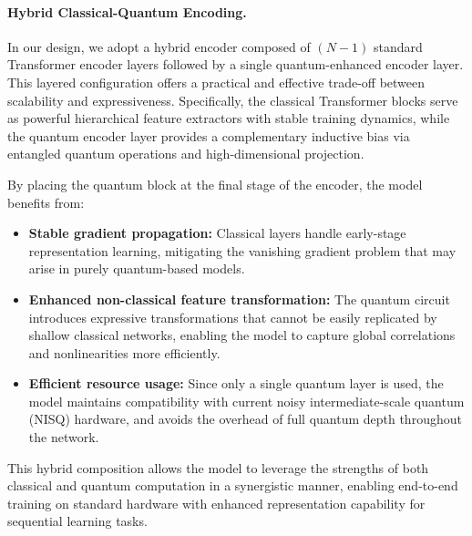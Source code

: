 \documentclass[conference]{IEEEtran}
\begin{document}
\paragraph{Hybrid Classical-Quantum Encoding.}

In our design, we adopt a hybrid encoder composed of $(N{-}1)$ standard Transformer encoder layers followed by a single quantum-enhanced encoder layer. This layered configuration offers a practical and effective trade-off between scalability and expressiveness. Specifically, the classical Transformer blocks serve as powerful hierarchical feature extractors with stable training dynamics, while the quantum encoder layer provides a complementary inductive bias via entangled quantum operations and high-dimensional projection.

By placing the quantum block at the final stage of the encoder, the model benefits from:
\begin{itemize}
    \item \textbf{Stable gradient propagation:} Classical layers handle early-stage representation learning, mitigating the vanishing gradient problem that may arise in purely quantum-based models.
    \item \textbf{Enhanced non-classical feature transformation:} The quantum circuit introduces expressive transformations that cannot be easily replicated by shallow classical networks, enabling the model to capture global correlations and nonlinearities more efficiently.
    \item \textbf{Efficient resource usage:} Since only a single quantum layer is used, the model maintains compatibility with current noisy intermediate-scale quantum (NISQ) hardware, and avoids the overhead of full quantum depth throughout the network.
\end{itemize}

This hybrid composition allows the model to leverage the strengths of both classical and quantum computation in a synergistic manner, enabling end-to-end training on standard hardware with enhanced representation capability for sequential learning tasks.
\end{document}
